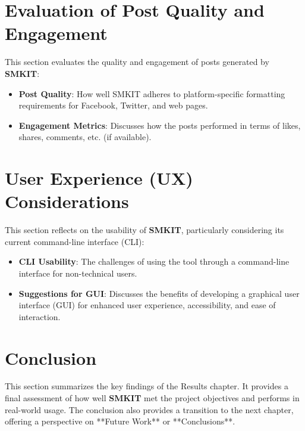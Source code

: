 \section{Evaluation of Post Quality and Engagement}
\label{sec:evaluation_post_quality}
This section evaluates the quality and engagement of posts generated by \textbf{SMKIT}:
\begin{itemize}
    \item \textbf{Post Quality}: How well SMKIT adheres to platform-specific formatting requirements for Facebook, Twitter, and web pages.
    \item \textbf{Engagement Metrics}: Discusses how the posts performed in terms of likes, shares, comments, etc. (if available).
\end{itemize}


\section{User Experience (UX) Considerations}
\label{sec:user_experience}
This section reflects on the usability of \textbf{SMKIT}, particularly considering its current command-line interface (CLI):
\begin{itemize}
    \item \textbf{CLI Usability}: The challenges of using the tool through a command-line interface for non-technical users.
    \item \textbf{Suggestions for GUI}: Discusses the benefits of developing a graphical user interface (GUI) for enhanced user experience, accessibility, and ease of interaction.
\end{itemize}


\section{Conclusion}
\label{sec:results_conclusion}
This section summarizes the key findings of the Results chapter. It provides a final assessment of how well \textbf{SMKIT} met the project objectives and performs in real-world usage. The conclusion also provides a transition to the next chapter, offering a perspective on **Future Work** or **Conclusions**.
